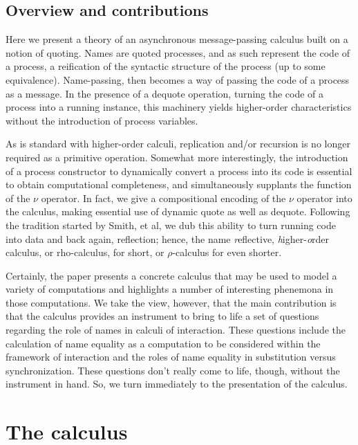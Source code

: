 \documentclass[]{amsart}
\theoremstyle{definition}
\theoremstyle{remark}
\numberwithin{equation}{subsection}
\begin{document}
\subsection{Overview and contributions} 

Here we present a theory of an asynchronous message-passing calculus
built on a notion of quoting. Names are quoted processes, and as such
represent the code of a process, a reification of the syntactic
structure of the process (up to some equivalence). Name-passing, then
becomes a way of passing the code of a process as a message. In the
presence of a dequote operation, turning the code of a process into a
running instance, this machinery yields higher-order characteristics
without the introduction of process variables.

As is standard with higher-order calculi, replication and/or recursion
is no longer required as a primitive operation. Somewhat more
interestingly, the introduction of a process constructor to
dynamically convert a process into its code is essential to obtain
computational completeness, and simultaneously supplants the function
of the $\nu$ operator. In fact, we give a compositional encoding of the
$\nu$ operator into the calculus, making essential use of dynamic
quote as well as dequote. Following the tradition started by Smith, et
al, \cite{lisp3} we dub this ability to turn running code into data and back
again, reflection; hence, the name \textit{r}eflective,
\textit{h}igher-\textit{o}rder calculus, or rho-calculus, for short,
or $\rho$-calculus for even shorter.

Certainly, the paper presents a concrete calculus that may be used to
model a variety of computations and highlights a number of interesting
phenemona in those computations. We take the view, however, that the
main contribution is that the calculus provides an instrument to bring
to life a set of questions regarding the role of names in calculi of
interaction. These questions include the calculation of name equality
as a computation to be considered within the framework of interaction
and the roles of name equality in substitution versus
synchronization. These questions don't really come to life, though,
without the instrument in hand. So, we turn immediately to the
presentation of the calculus.


\section{The calculus}
\end{document}
